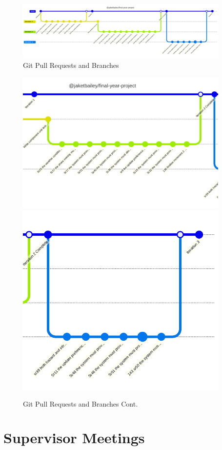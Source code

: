 \begin{figure}[!ht]
    \centering
    \includegraphics[width=400px]{figures/gitgraph1.pdf}
    \caption{Git Pull Requests and Branches}
    \label{fig:gitgraph}
\end{figure}
\begin{figure}[!ht]
    \centering
    \includegraphics[width=400px]{figures/gitgraph2.pdf}
    \includegraphics[width=400px]{figures/gitgraph3.pdf}
    \caption{Git Pull Requests and Branches Cont.}
    \label{fig:gitgraph2}
\end{figure}

\clearpage
\section{Supervisor Meetings}
\label{pm:supervisor_meetings}

